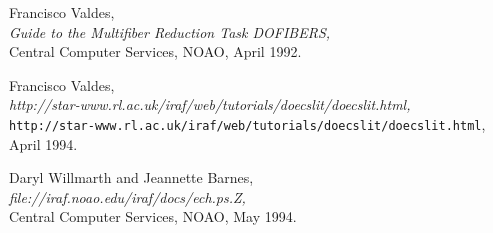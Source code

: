 \begin{thebibliography}{999}
 Francisco Valdes,\\
      {\sl Guide to the Multifiber Reduction Task DOFIBERS,}\\
      Central Computer Services, NOAO, April 1992.

 Francisco Valdes,\\
      {\sl
      {http://star-www.rl.ac.uk/iraf/web/tutorials/doecslit/doecslit.html},}\\
      {\tt http://star-www.rl.ac.uk/iraf/web/tutorials/doecslit/doecslit.html},
      \\
      April 1994.

 Daryl Willmarth and Jeannette Barnes,\\
      {\sl
      {file://iraf.noao.edu/iraf/docs/ech.ps.Z},}\\
      Central Computer Services, NOAO, May 1994.

\end{thebibliography}


